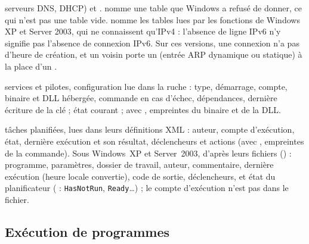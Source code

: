 \documentclass[11pt,a4paper,oneside]{report}
\begin{document}
\begin{description}[style=nextline,leftmargin=1.2em]
        serveurs DNS, DHCP) et .  nomme une
        table que Windows a refusé de donner, ce qui n'est pas une table vide.
         nomme les tables lues par les fonctions de
        Windows XP et Server 2003, qui ne connaissent qu'IPv4 : l'absence de
        ligne IPv6 n'y signifie pas l'absence de connexion IPv6. Sur ces
        versions, une connexion n'a pas d'heure de création, et un voisin
        porte un  (entrée ARP dynamique ou statique) à la place
        d'un .
  \item[\fichier{services.json}] services et pilotes, configuration lue dans la
        ruche : type, démarrage, compte, binaire et DLL hébergée, commande en cas
        d'échec, dépendances, dernière écriture de la clé ; état courant ; avec
        , empreintes du binaire et de la DLL.
  \item[\fichier{ScheduledTasks.json}] tâches planifiées, lues dans leurs
        définitions XML : auteur, compte d'exécution, état, dernière exécution et
        son résultat, déclencheurs et actions (avec , empreintes de la
        commande). Sous Windows~XP et Server~2003, d'après leurs fichiers
         () : programme, paramètres, dossier de
        travail, auteur, commentaire, dernière exécution (heure locale
        convertie), code de sortie, déclencheurs, et état du planificateur
        ( : \texttt{HasNotRun}, \texttt{Ready}\ldots) ; le
        compte d'exécution n'est pas dans le fichier.
\end{description}

\subsection{Exécution de programmes}
\end{document}
